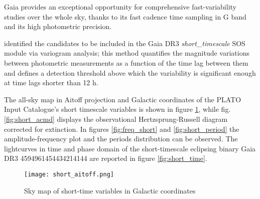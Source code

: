 Gaia provides an exceptional opportunity for comprehensive fast-variability studies over the whole sky, thanks to its fast cadence time sampling in G band and its high photometric precision.

\cite{Roelens_2018} identified the candidates to be included in the Gaia DR3 \textit{short\_timescale} SOS module via variogram analysis; this method quantifies the magnitude variations between photometric measurements as a function of the time lag between them and defines a detection threshold above which the variability is significant enough at time lags shorter than 12 h.





The all-sky map in Aitoff projection and Galactic coordinates of the PLATO Input Catalogue's short timescale variables is shown in figure \ref{fig:All-sky map of short-time variables}, while fig. \ref{fig:short_acmd} displays the observational Hertzsprung-Russell diagram corrected for extinction.
In figures \ref{fig:freq_short} and \ref{fig:short_period} the amplitude-frequency plot and the periods distribution can be observed.
The lightcurves in time and phase domain of the short-timescale eclipsing binary Gaia DR3  4594961454434214144 are reported in figure \ref{fig:short_time}.


\begin{figure}[H]
\centering
\texttt{[image: short\_aitoff.png]}
\caption{Sky map of short-time variables in Galactic coordinates }
\label{fig:All-sky map of short-time variables}
\end{figure}

\begin{comment}
\begin{figure}[H]
\centering
\texttt{[image: short\_cmd.png]}
\caption{Absolute CMD corrected for extinction for short timescale variables in LOPN1}
\label{fig:Absolute CMD corrected for extinction for the short timescale variables in LOPN1}
\end{figure}


\begin{figure}[H]
\centering
\texttt{[image: short2\_cmd.png]}
\caption{Absolute CMD corrected for extinction for short timescale variables in LOPS2}
\label{fig:Absolute CMD corrected for extinction for the short timescale variables in LOPS2}
\end{figure}
\end{comment}

